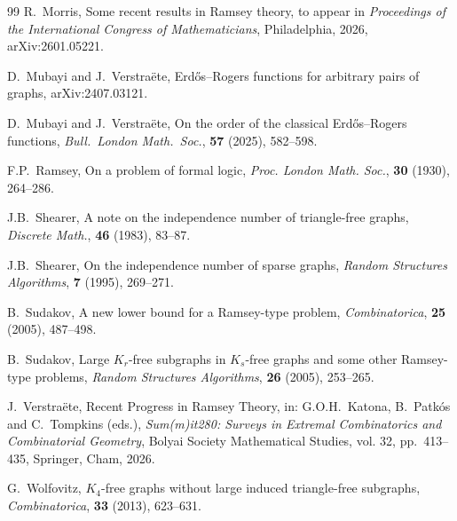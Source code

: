 \documentclass[12pt,reqno]{amsart}
\theoremstyle{remark}
\numberwithin{theorem}{section}
\renewcommand{\(}{\bigl(}
\renewcommand{\)}{\bigr)\vphantom{)}}
\begin{document}
\begin{thebibliography}{99}
 R.~Morris, Some recent results in Ramsey theory, to appear in \emph{Proceedings of the International Congress of Mathematicians}, Philadelphia,  2026, arXiv:2601.05221.

 D.~Mubayi and J.~Verstra{\"e}te, Erd{\H{o}}s--Rogers functions for arbitrary pairs of graphs, arXiv:2407.03121.

 D.~Mubayi and J.~Verstra\"ete, On the order of the classical Erd\H{o}s--Rogers functions, \emph{Bull.~London Math.~Soc.}, \textbf{57} (2025), 582--598.

 F.P.~Ramsey, On a problem of formal logic, \emph{Proc. London Math. Soc.}, \textbf{30} (1930), 264--286.


 J.B.~Shearer, A note on the independence number of triangle-free graphs, \emph{Discrete Math.}, \textbf{46} (1983), 83--87.

 J.B.~Shearer, On the independence number of sparse graphs, \emph{Random Structures Algorithms}, \textbf{7} (1995), 269--271.

 B.~Sudakov, A new lower bound for a Ramsey-type problem, \emph{Combinatorica}, \textbf{25} (2005), 487--498.

 B.~Sudakov, Large $K_r$-free subgraphs in $K_s$-free graphs and some other Ramsey-type problems, \emph{Random Structures Algorithms}, \textbf{26} (2005), 253--265.

 J.~Verstra\"ete, Recent Progress in Ramsey Theory, in: G.O.H.~Katona, B.~Patk{\'o}s and C.~Tompkins (eds.), \emph{Sum(m)it280: Surveys in Extremal Combinatorics and Combinatorial Geometry}, Bolyai Society Mathematical Studies, vol. 32, pp.~413--435, Springer, Cham, 2026.

 G.~Wolfovitz, $K_4$-free graphs without large induced triangle-free subgraphs, \emph{Combinatorica}, \textbf{33} (2013), 623--631.

\end{thebibliography}
\end{document}
